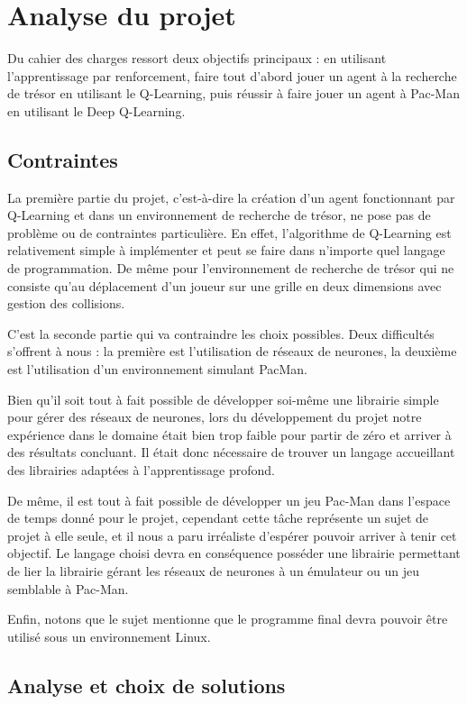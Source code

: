 \chapter{Analyse du projet}
Du cahier des charges ressort deux objectifs principaux : en utilisant l'apprentissage par renforcement, faire tout d'abord jouer un agent à la recherche de trésor en utilisant le Q-Learning, puis réussir à faire jouer un agent à Pac-Man en utilisant le Deep Q-Learning.

\section{Contraintes}

La première partie du projet, c'est-à-dire la création d'un agent fonctionnant par Q-Learning et dans un environnement de recherche de trésor, ne pose pas de problème ou de contraintes particulière. En effet, l'algorithme de Q-Learning est relativement simple à implémenter et peut se faire dans n'importe quel langage de programmation. De même pour l'environnement de recherche de trésor qui ne consiste qu'au déplacement d'un joueur sur une grille en deux dimensions avec gestion des collisions.
\par
C'est la seconde partie qui va contraindre les choix possibles. Deux difficultés s'offrent à nous : la première est l'utilisation de réseaux de neurones, la deuxième est l'utilisation d'un environnement simulant PacMan.
\par
Bien qu'il soit tout à fait possible de développer soi-même une librairie simple pour gérer des réseaux de neurones, lors du développement du projet notre expérience dans le domaine était bien trop faible pour partir de zéro et arriver à des résultats concluant. Il était donc nécessaire de trouver un langage accueillant des librairies adaptées à l'apprentissage profond.
\par
De même, il est tout à fait possible de développer un jeu Pac-Man dans l'espace de temps donné pour le projet, cependant cette tâche représente un sujet de projet à elle seule, et il nous a paru irréaliste d'espérer pouvoir arriver à tenir cet objectif. Le langage choisi devra en conséquence posséder une librairie permettant de lier la librairie gérant les réseaux de neurones à un émulateur ou un jeu semblable à Pac-Man.
\par
Enfin, notons que le sujet mentionne que le programme final devra pouvoir être utilisé sous un environnement Linux.


\section{Analyse et choix de solutions}
